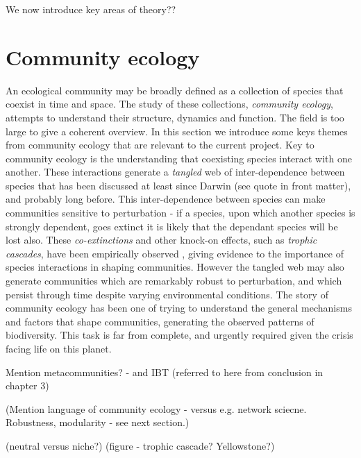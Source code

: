 We now introduce key areas of theory??
  
\section{Community ecology}
\label{sec:intro_community_ecology}

An ecological community may be broadly defined as a collection of species that coexist in time and space. The study of these collections, \emph{community ecology}, attempts to understand their structure, dynamics and function. The field is too large to give a coherent overview. In this section we introduce some keys themes from community ecology that are relevant to the current project. Key to community ecology is the understanding that coexisting species interact with one another. These interactions generate a \emph{tangled} web of inter-dependence between species that has been discussed at least since Darwin \cite{darwin2009origin} (see quote in front matter), and probably long before. This inter-dependence between species can make communities sensitive to perturbation - if a species, upon which another species is strongly dependent, goes extinct it is likely that the dependant species will be lost also. These \emph{co-extinctions} and other knock-on effects, such as \emph{trophic cascades}, have been empirically observed \cite{knight2005trophic,ripple2012trophic}, giving evidence to the importance of species interactions in shaping communities.   However the tangled web may also generate communities which are remarkably robust to perturbation, and which persist through time despite varying environmental conditions. The story of community ecology has been one of trying to understand the general mechanisms and factors that shape communities, generating the observed patterns of biodiversity. This task is far from complete, and urgently required given the crisis facing life on this planet.

Mention metacommunities? - and IBT (referred to here from conclusion in chapter 3)

(Mention language of community ecology - versus e.g. network sciecne. Robustness, modularity - see next section.)

(neutral versus niche?)
(figure - trophic cascade? Yellowstone?)


